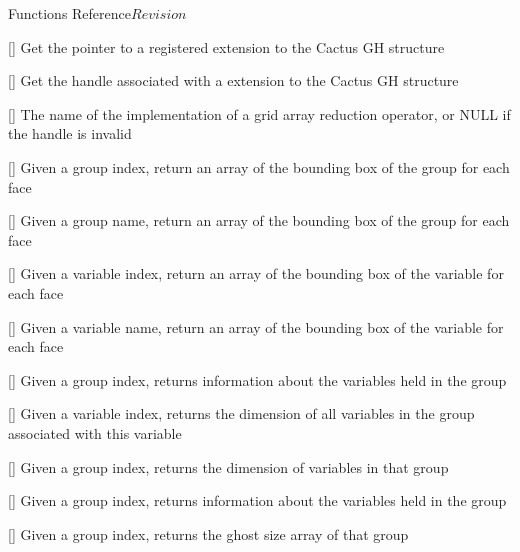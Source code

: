 \begin{cactuspart}{ Functions Reference}{}{$Revision$}
\begin{Lentry}
\item[\code{CCTK\_GHExtension}] [\pageref{CCTK-GHExtension}]
  Get the pointer to a registered extension to the Cactus GH structure

\item[\code{CCTK\_GHExtensionHandle}] [\pageref{CCTK-GHExtensionHandle}]
  Get the handle associated with a extension to the Cactus GH structure

\item[\code{CCTK\_GridArrayReductionOperator}] [\pageref{CCTK-GridArrayReductionOperator}]
     The name of the implementation of a grid array reduction operator, or NULL if the handle is invalid

\item[\code{CCTK\_GroupbboxGI}] [\pageref{CCTK-GroupbboxGI}]
  Given a group index, return an array of the bounding box
  of the group for each face

\item[\code{CCTK\_GroupbboxGN}] [\pageref{CCTK-GroupbboxGN}]
  Given a group name, return an array of the bounding box
  of the group for each face

\item[\code{CCTK\_GroupbboxVI}] [\pageref{CCTK-GroupbboxVI}]
  Given a variable index, return an array of the bounding box
  of the variable for each face

\item[\code{CCTK\_GroupbboxVN}] [\pageref{CCTK-GroupbboxVN}]
  Given a variable name, return an array of the bounding box
  of the variable for each face

\item[\code{CCTK\_GroupData}] [\pageref{CCTK-GroupData}]
  Given a group index, returns information about the variables
  held in the group

\item[\code{CCTK\_GroupDimFromVarI}] [\pageref{CCTK-GroupDimFromVarI}]
  Given a variable index, returns the dimension of all variables in the group
  associated with this variable

\item[\code{CCTK\_GroupDimI}] [\pageref{CCTK-GroupDimI}]
  Given a group index, returns the dimension of variables in that group

\item[\code{CCTK\_GroupDynamicData}] [\pageref{CCTK-GroupDynamicData}]
  Given a group index, returns information about the variables
  held in the group

\item[\code{CCTK\_GroupGhostsizesI}] [\pageref{CCTK-GroupGhostsizesI}]
  Given a group index, returns the ghost size array of that group


\end{Lentry}
\end{cactuspart}
